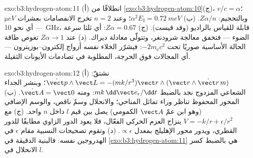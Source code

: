 \begin{solution}{exo:b3:hydrogen-atom:11}
(أ) انطلاقًا من \cref{exo:b3:hydrogen-atom:10}(ج)، $v/c = \alpha$؛
وبالتحجيم: $Z\alpha/n$. (ب) $\alpha^2E_{\text{I}} = \qty{0.72}{meV}$؛
وعند $n = 2$ تخرج الانفصامات بعشرات $\unit{\micro eV}$ ---
أي نحو \qty{10}{GHz}، قابلة للقياس بالراديو (وقد قيست). (ج) $Z\alpha =
0.67$: أي ثلثا سرعة الضوء --- فتخفق معالجة شرودنغر،
وتتولّى معادلة ديراك. (د) عند $Z\alpha \to 1$ تغوص طاقة الحالة
الأساسية صوريًا تحت $-2m_{\text{e}}c^2$: فيشرّر الخلاء نفسه
أزواج إلكترون--بوزيترون --- أي المجالات فوق الحرجة،
المطلوبة في تصادمات الأيونات الثقيلة.
\end{solution}

\begin{solution}{exo:b3:hydrogen-atom:12}
(أ) نشتقّ: $\dot{\vect p}\wedge\vect L = -(mk/r^3)\vect
r\wedge(\vect r\wedge\dot{\vect r}\,m)$؛ وبنشر الجداء الشعاعي
المزدوج نجد بالضبط $mk\,\dd\vect e_r/\dd t$: ومنه $\dot{\vect A} =
\vect 0$. (ب) المحور المحفوظ تناظر وراء تماثل المناحي؛
والانحلال وسمٌ ناقص، والوسم الإضافي (وهو ابن عمّ $\vect
A$ الكمومي) يصل بين قيم $l$ داخل $n$ واحد. (ج) مع
$V = -k/r + \epsilon/r^2$ ينزاح العزم الحركي الفعّال، فلا يعود
الدور الزاوي مطابقًا للدور القطري، ويدور
محور الإهليلج بمعدل $\propto\epsilon$. (د) وتقوم تصحيحات
النسبية مقام $\epsilon$ في الهدروجين نفسه: فالبنية الدقيقة في
\cref{exo:b3:hydrogen-atom:11} هي بالضبط
كسر الانحلال في $l$.
\end{solution}

